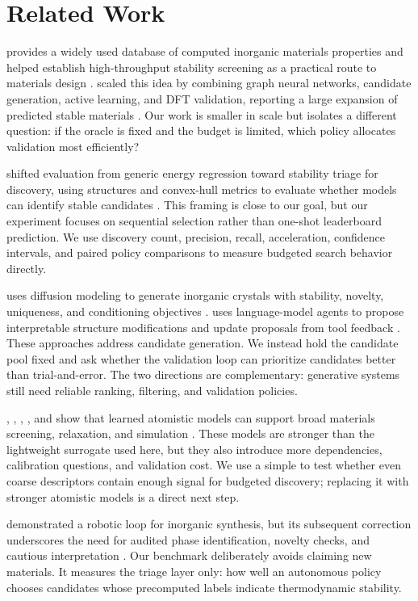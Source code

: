 \section{Related Work}
\label{sec:related_work}

\mpdata provides a widely used database of computed inorganic materials properties and helped establish high-throughput stability screening as a practical route to materials design \cite{jain2013materials}. \gnome scaled this idea by combining graph neural networks, candidate generation, active learning, and DFT validation, reporting a large expansion of predicted stable materials \cite{merchant2023gnome}. Our work is smaller in scale but isolates a different question: if the oracle is fixed and the budget is limited, which policy allocates validation most efficiently?

\matbench shifted evaluation from generic energy regression toward stability triage for discovery, using \wbm structures and convex-hull metrics to evaluate whether models can identify stable candidates \cite{riebesell2023matbench}. This framing is close to our goal, but our experiment focuses on sequential selection rather than one-shot leaderboard prediction. We use discovery count, precision, recall, acceleration, confidence intervals, and paired policy comparisons to measure budgeted search behavior directly.

\mattergen uses diffusion modeling to generate inorganic crystals with stability, novelty, uniqueness, and conditioning objectives \cite{zeni2023mattergen}. \llmatdesign uses language-model agents to propose interpretable structure modifications and update proposals from tool feedback \cite{jia2024llmatdesign}. These approaches address candidate generation. We instead hold the candidate pool fixed and ask whether the validation loop can prioritize candidates better than trial-and-error. The two directions are complementary: generative systems still need reliable ranking, filtering, and validation policies.

\mthreegnet, \chgnet, \macemp, \omat, and \uma show that learned atomistic models can support broad materials screening, relaxation, and simulation \cite{chen2022m3gnet,deng2023chgnet,batatia2024foundation,barroso2024omat24,wood2025uma}. These models are stronger than the lightweight surrogate used here, but they also introduce more dependencies, calibration questions, and validation cost. We use a simple \mlp to test whether even coarse descriptors contain enough signal for budgeted discovery; replacing it with stronger atomistic models is a direct next step.

\alab demonstrated a robotic loop for inorganic synthesis, but its subsequent correction underscores the need for audited phase identification, novelty checks, and cautious interpretation \cite{szymanski2023alab,nature2026alabcorrection}. Our benchmark deliberately avoids claiming new materials. It measures the triage layer only: how well an autonomous policy chooses candidates whose precomputed labels indicate thermodynamic stability.
